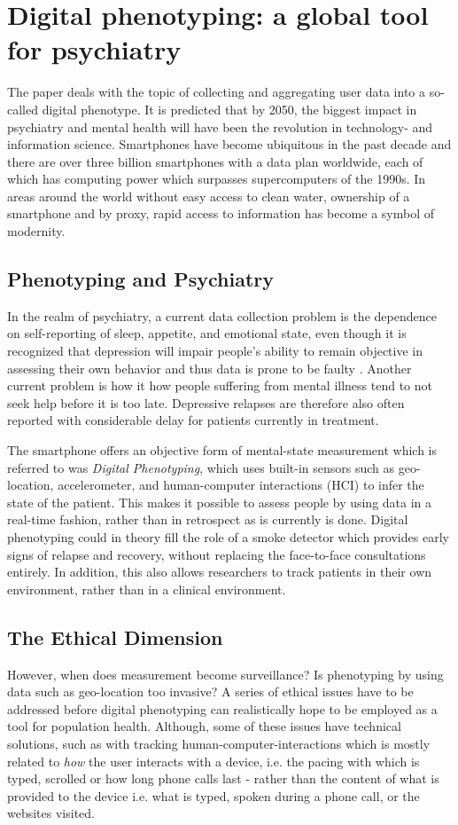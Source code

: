 \section{Digital phenotyping: a global tool for psychiatry}



The paper \cite{digital_phenotyping} deals with the topic of collecting and aggregating user data into a so-called digital phenotype. It is predicted that by 2050, the biggest impact in psychiatry and mental health will have been the revolution in technology- and information science. Smartphones have become ubiquitous in the past decade and there are over three billion smartphones with a data plan worldwide, each of which has computing power which surpasses supercomputers of the 1990s. In areas around the world without easy access to clean water, ownership of a smartphone and by proxy, rapid access to information has become a symbol of modernity. 

\subsection{Phenotyping and Psychiatry}
In the realm of psychiatry, a current data collection problem is the dependence on self-reporting of sleep, appetite, and emotional state, even though it is recognized that depression will impair people's ability to remain objective in assessing their own behavior and thus data is prone to be faulty \cite{digital_phenotyping}. Another current problem is how it how people suffering from mental illness tend to not seek help before it is too late. Depressive relapses are therefore also often reported with considerable delay for patients currently in treatment. 

The smartphone offers an objective form of mental-state measurement which is referred to was \textit{Digital Phenotyping}, which uses built-in sensors such as geo-location, accelerometer, and human-computer interactions (HCI) to infer the state of the patient. This makes it possible to assess people by using data in a real-time fashion, rather than in retrospect as is currently is done. Digital phenotyping could in theory fill the role of a smoke detector which provides early signs of relapse and recovery, without replacing the face-to-face consultations entirely. In addition, this also allows researchers to track patients in their own environment, rather than in a clinical environment.

\subsection{The Ethical Dimension}
However, when does measurement become surveillance? Is phenotyping by using data such as geo-location too invasive? A series of ethical issues have to be addressed before digital phenotyping can realistically hope to be employed as a tool for population health. Although, some of these issues have technical solutions, such as with tracking human-computer-interactions which is mostly related to \textit{how} the user interacts with a device, i.e. the pacing with which is typed, scrolled or how long phone calls last - rather than the content of what is provided to the device i.e. what is typed, spoken during a phone call, or the websites visited. 
